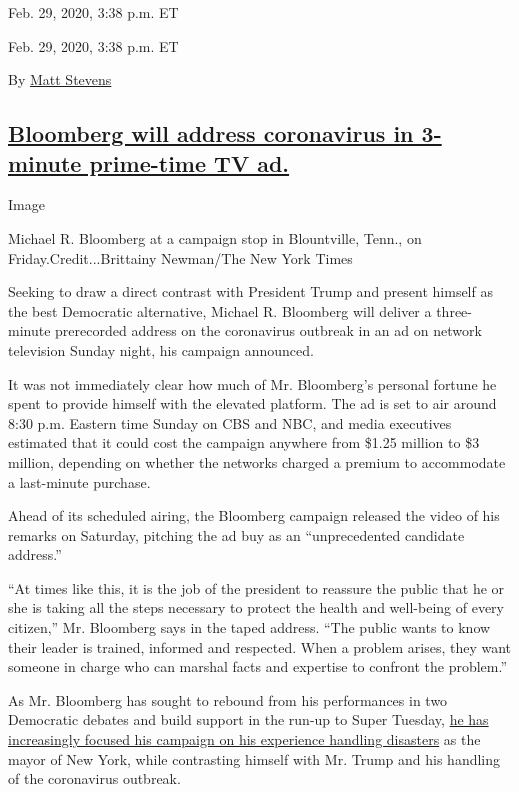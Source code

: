 Feb. 29, 2020, 3:38 p.m. ET

Feb. 29, 2020, 3:38 p.m. ET

By \href{https://www.nytimes3xbfgragh.onion/by/matt-stevens}{Matt
Stevens}

\hypertarget{bloomberg-will-address-coronavirus-in-3-minute-prime-time-tv-ad}{%
\subsection{\texorpdfstring{\protect\hyperlink{bloomberg-coronavirus-ad}{Bloomberg
will address coronavirus in 3-minute prime-time TV
ad.}}{Bloomberg will address coronavirus in 3-minute prime-time TV ad.}}\label{bloomberg-will-address-coronavirus-in-3-minute-prime-time-tv-ad}}

Image

Michael R. Bloomberg at a campaign stop in Blountville, Tenn., on
Friday.Credit...Brittainy Newman/The New York Times

Seeking to draw a direct contrast with President Trump and present
himself as the best Democratic alternative, Michael R. Bloomberg will
deliver a three-minute prerecorded address on the coronavirus outbreak
in an ad on network television Sunday night, his campaign announced.

It was not immediately clear how much of Mr. Bloomberg's personal
fortune he spent to provide himself with the elevated platform. The ad
is set to air around 8:30 p.m. Eastern time Sunday on CBS and NBC, and
media executives estimated that it could cost the campaign anywhere from
\$1.25 million to \$3 million, depending on whether the networks charged
a premium to accommodate a last-minute purchase.

Ahead of its scheduled airing, the Bloomberg campaign released the video
of his remarks on Saturday, pitching the ad buy as an ``unprecedented
candidate address.''

``At times like this, it is the job of the president to reassure the
public that he or she is taking all the steps necessary to protect the
health and well-being of every citizen,'' Mr. Bloomberg says in the
taped address. ``The public wants to know their leader is trained,
informed and respected. When a problem arises, they want someone in
charge who can marshal facts and expertise to confront the problem.''

As Mr. Bloomberg has sought to rebound from his performances in two
Democratic debates and build support in the run-up to Super Tuesday,
\href{https://www.nytimes3xbfgragh.onion/2020/02/28/us/politics/michael-bloomberg-mayor-experience-2020.html}{he
has increasingly focused his campaign on his experience handling
disasters} as the mayor of New York, while contrasting himself with Mr.
Trump and his handling of the coronavirus outbreak.

